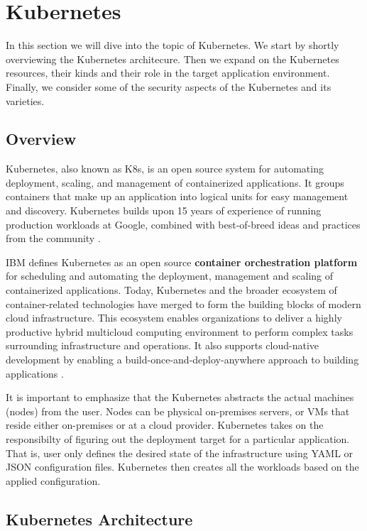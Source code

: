 \section{Kubernetes}

In this section we will dive into the topic of Kubernetes. We start by shortly overviewing the Kubernetes architecure. Then we expand on the Kubernetes resources, their kinds and their role in the target application environment. Finally, we consider some of the security aspects of the Kubernetes and its varieties.

\subsection{Overview}

Kubernetes, also known as K8s, is an open source system for automating deployment, scaling, and management of containerized applications. It groups containers that make up an application into logical units for easy management and discovery. Kubernetes builds upon 15 years of experience of running production workloads at Google, combined with best-of-breed ideas and practices from the community \cite{kubernetes}.

IBM defines Kubernetes as an open source \textbf{container orchestration platform} for scheduling and automating the deployment, management and scaling of containerized applications. Today, Kubernetes and the broader ecosystem of container-related technologies have merged to form the building blocks of modern cloud infrastructure. This ecosystem enables organizations to deliver a highly productive hybrid multicloud computing environment to perform complex tasks surrounding infrastructure and operations. It also supports cloud-native development by enabling a build-once-and-deploy-anywhere approach to building applications \cite{ibm-kubernetes}.

It is important to emphasize that the Kubernetes abstracts the actual machines (nodes) from the user. Nodes can be physical on-premises servers, or VMs that reside either on-premises or at a cloud provider. Kubernetes takes on the responsibilty of figuring out the deployment target for a particular application. That is, user only defines the desired state of the infrastructure using YAML or JSON configuration files. Kubernetes then creates all the workloads based on the applied configuration.

\subsection{Kubernetes Architecture}

